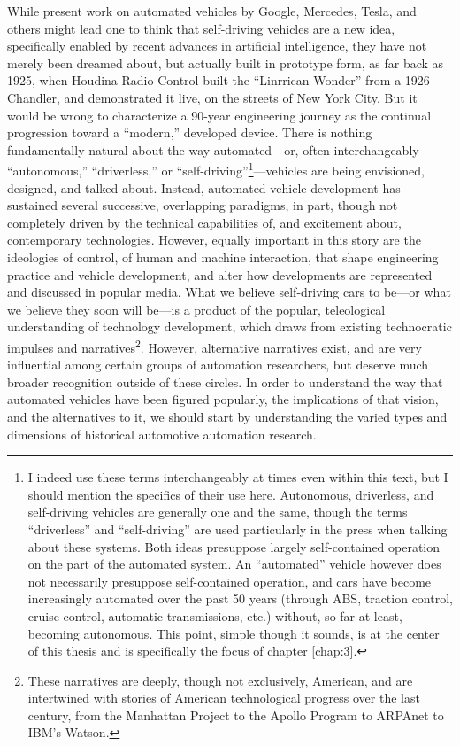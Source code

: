While present work on automated vehicles by Google, Mercedes, Tesla,
and others might lead one to think that self-driving vehicles are a
new idea, specifically enabled by recent advances in artificial
intelligence, they have not merely been dreamed about, but actually
built in prototype form, as far back as 1925, when Houdina Radio Control
built the ``Linrrican Wonder'' from a 1926 Chandler, and demonstrated
it live, on the streets of New York City. But it would be wrong to
characterize a 90-year engineering journey as the continual
progression toward a ``modern,'' developed device. There is nothing
fundamentally natural about the way automated---or, often interchangeably
``autonomous,'' ``driverless,'' or ``self-driving''\footnote{I indeed use these terms
  interchangeably at times even within this text, but I should mention
the specifics of their use here. Autonomous, driverless, and self-driving
vehicles are generally one and the same, though the terms
``driverless'' and
``self-driving'' are used particularly in the press when talking about
these systems. Both ideas presuppose largely self-contained operation
on the part of the automated system. An ``automated'' vehicle however
does not necessarily presuppose self-contained operation, and cars
have become increasingly automated over the past 50 years (through
ABS, traction control, cruise control, automatic transmissions, etc.) without, so
far at least, becoming autonomous. This point, simple though it
sounds, is at the center of this thesis and is specifically the focus
of chapter \ref{chap:3}.}---vehicles are being
envisioned, designed, and talked about. Instead, automated vehicle
development has sustained several successive, overlapping paradigms,
in part, though not completely driven by the technical capabilities
of, and excitement about, contemporary technologies. However, equally
important in this story are the ideologies of control, of human and
machine interaction, that shape engineering practice and vehicle
development, and alter how developments are represented and discussed
in popular media. What we believe self-driving cars to be---or what we
believe they soon will be---is a product of the popular, teleological understanding
of technology development, which draws from existing technocratic
impulses and narratives\footnote{These narratives are deeply, though
  not exclusively, American, and are intertwined with stories of
  American technological progress over the last century, from the
  Manhattan Project to the Apollo Program to ARPAnet to IBM's
  Watson.}. However, alternative narratives exist, and 
are very influential among certain groups of automation researchers,
but deserve much broader recognition outside of these circles. In
order to understand the way that automated vehicles have been figured
popularly, the implications of that vision, and the alternatives to
it, we should start by understanding the varied types and dimensions
of historical automotive automation research.

